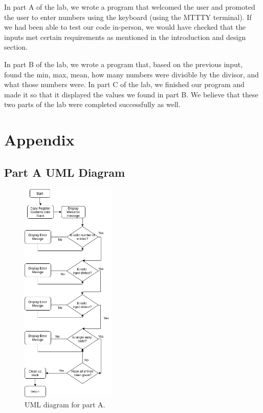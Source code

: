 \documentclass[10pt, letterpaper, titlepage]{article} %
\begin{document}
\begin{multicols*}{2}
In part A of the lab, we wrote a program that welcomed the user and promoted the user to enter numbers using the keyboard (using the MTTTY terminal). 
If we had been able to test our code in-person, we would have checked that the inputs met certain requirements as mentioned in the introduction and design section. 

In part B of the lab, we wrote a program that, based on the previous input, found the min, max, mean, how many numbers were divisible by the divisor, and what those numbers were. 
In part C of the lab, we finished our program and made it so that it displayed the values we found in part B. 
We believe that these two parts of the lab were completed successfully as well. 

\end{multicols*}

\newpage

\section{Appendix}

\subsection{Part A UML Diagram}
\begin{figure}[H]
   \includegraphics[width=0.4\textwidth]{UMLA.png}
   \centering  
   \caption{UML diagram for part A.} 
   \label{figure:1}
\end{figure}
\end{document}
